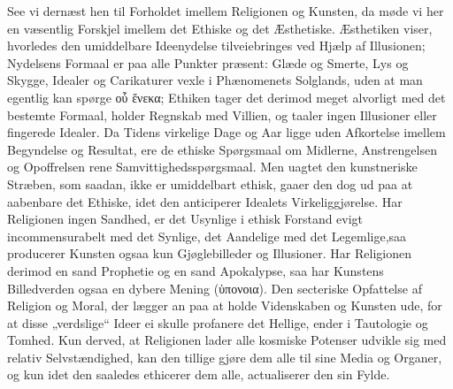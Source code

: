 \documentclass[12pt]{book}
\newcommand{\opage}[1]{\marginnote{\footnotesize\textit{[#1]}}}
\begin{document}
See vi dernæst hen til Forholdet imellem Religionen og Kunsten, da møde vi her en
væsentlig Forskjel imellem det Ethiske og det Æsthetiske. Æsthetiken viser, hvorledes
den umiddelbare Ideenydelse tilveiebringes ved Hjælp af Illusionen; Nydelsens Formaal
er paa alle Punkter præsent: Glæde og Smerte, Lys og Skygge, Idealer og Carikaturer
vexle i Phænomenets Solglands, uden at man egentlig kan spørge οὗ ἕνεκα; Ethiken
tager det derimod meget alvorligt med det bestemte Formaal, holder Regnskab med
Villien, og taaler ingen Illusioner eller fingerede Idealer. Da Tidens virkelige Dage
og Aar ligge uden Afkortelse imellem Begyndelse og Resultat, ere de ethiske
Spørgsmaal om Midlerne, Anstrengelsen og Opoffrelsen rene Samvittighedsspørgsmaal.
Men uagtet den kunstneriske Stræben, som saadan, ikke er umiddelbart ethisk, gaaer
den dog ud paa at aabenbare det Ethiske, idet den anticiperer Idealets
Virkeliggjørelse. Har Religionen ingen Sandhed, er det Usynlige i ethisk Forstand
evigt incommensurabelt med det Synlige, det Aandelige med det Legemlige,saa
producerer Kunsten ogsaa kun Gjøglebilleder og Illusioner. Har Religionen derimod en
sand Prophetie og en sand Apokalypse, saa har Kunstens Billedverden ogsaa en dybere
Mening (ὑπονοια). Den secteriske Opfattelse af
\opage{270} Religion og Moral, der lægger an paa at holde Videnskaben og Kunsten ude, for at
disse „verdslige“ Ideer ei skulle profanere det Hellige, ender i Tautologie og
Tomhed. Kun derved, at Religionen lader alle kosmiske Potenser udvikle sig med
relativ Selvstændighed, kan den tillige gjøre dem alle til sine Media og Organer, og
kun idet den saaledes ethicerer dem alle, actualiserer den sin Fylde.
\end{document}
